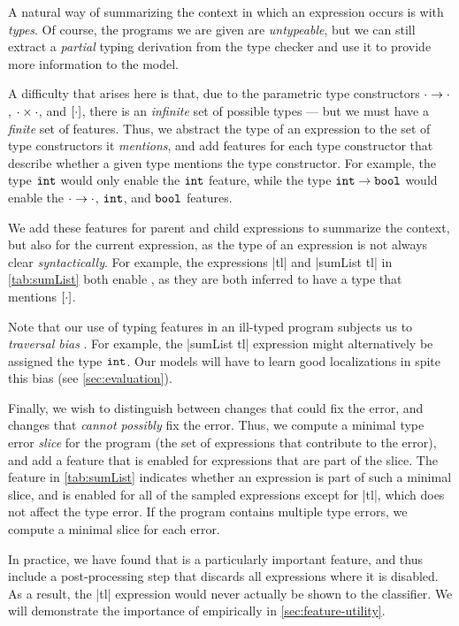 A natural way of summarizing the context in which an expression occurs is with \emph{types}.
%
Of course, the programs we are given are \emph{untypeable}, but we can still extract a \emph{partial} typing derivation
from the type checker and use it to provide more information to the model.

A difficulty that arises here is that, due to the parametric type constructors $\cdot \to \cdot$,
$\cdot \times \cdot$, and $[\cdot]$, there is an \emph{infinite} set of possible types --- but we must have a
\emph{finite} set of features.
%
Thus, we abstract the type of an expression to the set of type constructors it \emph{mentions}, and add features for
each type constructor that describe whether a given type mentions the type constructor.
%
For example, the type $\mathtt{int}$ would only enable the $\mathtt{int}$ feature, while the type $\mathtt{int} \to \mathtt{bool}$ would enable
the $\cdot \to \cdot$, $\mathtt{int}$, and $\mathtt{bool}$ features.

We add these features for parent and child expressions to summarize the context, but also for the current expression, as
the type of an expression is not always clear \emph{syntactically}.
%
For example, the expressions |tl| and |sumList tl| in \autoref{tab:sumList} both enable \HasTypeList, as they are both
inferred to have a type that mentions $[\cdot]$.

Note that our use of typing features in an ill-typed program subjects us to \emph{traversal bias} \citep{McAdam1998-ub}.
For example, the |sumList tl| expression might alternatively be assigned the type $\mathtt{int}$.
%
Our models will have to learn good localizations in spite this bias (see \autoref{sec:evaluation}).

Finally, we wish to distinguish between changes that could fix the error, and changes that \emph{cannot possibly} fix
the error.
%
Thus, we compute a minimal type error \emph{slice} for the program (\ie the set of expressions that contribute to the
error), and add a feature that is enabled for expressions that are part of the slice.
%
The \InSlice feature in \autoref{tab:sumList} indicates whether an expression is part of such a minimal slice, and is
enabled for all of the sampled expressions except for |tl|, which does not affect the type error.
%
If the program contains multiple type errors, we compute a minimal slice for each error.

In practice, we have found that \InSlice is a particularly important feature, and thus include a post-processing step
that discards all expressions where it is disabled.
%
As a result, the |tl| expression would never actually be shown to the classifier.
%
We will demonstrate the importance of \InSlice empirically in \autoref{sec:feature-utility}.


